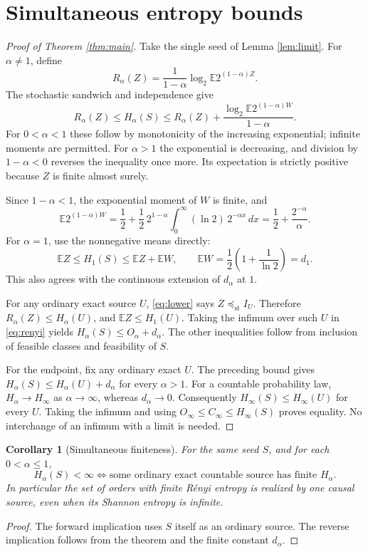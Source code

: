\documentclass[11pt,a4paper]{article}
\newtheorem{corollary}[theorem]{Corollary}
\newcommand{\E}{\mathbb E}
\newcommand{\st}{\preceq_{\mathrm{st}}}
\begin{document}
\section{Simultaneous entropy bounds}
\begin{proof}[Proof of Theorem \ref{thm:main}]
Take the single seed of Lemma \ref{lem:limit}. For $\alpha\ne1$, define
\[
 R_\alpha(Z)=\frac{1}{1-\alpha}\log_2\E 2^{(1-\alpha)Z}.
\]
The stochastic sandwich and independence give
\begin{equation}\label{eq:renyi}
 R_\alpha(Z)\le H_\alpha(S)\le
 R_\alpha(Z)+\frac{\log_2\E2^{(1-\alpha)W}}{1-\alpha}.
\end{equation}
For $0<\alpha<1$ these follow by monotonicity of the increasing exponential;
infinite moments are permitted. For $\alpha>1$ the exponential is decreasing,
and division by $1-\alpha<0$ reverses the inequality once more. Its
expectation is strictly positive because $Z$ is finite almost surely.

Since $1-\alpha<1$, the exponential moment of $W$ is finite, and
\[
 \E2^{(1-\alpha)W}
 =\frac12+\frac12\,2^{1-\alpha}
   \int_0^\infty(\ln2)\,2^{-\alpha x}\,dx
 =\frac12+\frac{2^{-\alpha}}{\alpha}.
\]
For $\alpha=1$, use the nonnegative means directly:
\[
 \E Z\le H_1(S)\le \E Z+\E W,\qquad
 \E W=\frac12\left(1+\frac1{\ln2}\right)=d_1.
\]
This also agrees with the continuous extension of $d_\alpha$ at $1$.

For any ordinary exact source $U$, \eqref{eq:lower} says $Z\st I_U$.
Therefore $R_\alpha(Z)\le H_\alpha(U)$, and $\E Z\le H_1(U)$.
Taking the infimum over such $U$ in \eqref{eq:renyi} yields
$H_\alpha(S)\le O_\alpha+d_\alpha$. The other inequalities follow from
inclusion of feasible classes and feasibility of $S$.

For the endpoint, fix any ordinary exact $U$. The preceding bound gives
$H_\alpha(S)\le H_\alpha(U)+d_\alpha$ for every $\alpha>1$.
For a countable probability law, $H_\alpha\to H_\infty$ as
$\alpha\to\infty$, whereas $d_\alpha\to0$. Consequently
$H_\infty(S)\le H_\infty(U)$ for every $U$. Taking the infimum and using
$O_\infty\le C_\infty\le H_\infty(S)$ proves equality.
No interchange of an infimum with a limit is needed.
\end{proof}

\begin{corollary}[Simultaneous finiteness]
For the same seed $S$, and for each $0<\alpha\le1$,
\[
 H_\alpha(S)<\infty
 \iff
 \text{some ordinary exact countable source has finite }H_\alpha.
\]
In particular the set of orders with finite R\'enyi entropy is realized
by one causal source, even when its Shannon entropy is infinite.
\end{corollary}
\begin{proof}
The forward implication uses $S$ itself as an ordinary source. The reverse
implication follows from the theorem and the finite constant $d_\alpha$.
\end{proof}
\end{document}
